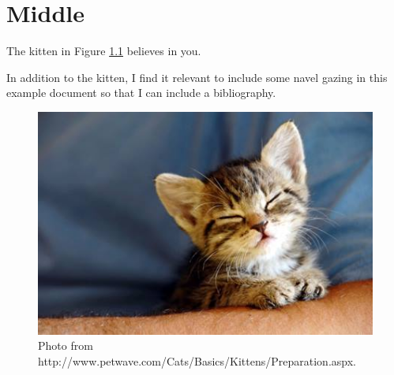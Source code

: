 \chapter{Middle}
The kitten in Figure \ref{fig:kitten} believes in you.


In addition to the kitten, I find it relevant to include some navel gazing in this example document \citep{steinhauser2009nature} so that I can include a bibliography.


\begin{figure}[h]
\centering
\includegraphics[scale=2]{kitten.jpg}
\caption{Photo from http://www.petwave.com/Cats/Basics/Kittens/Preparation.aspx.}
\label{fig:kitten}
\end{figure}
